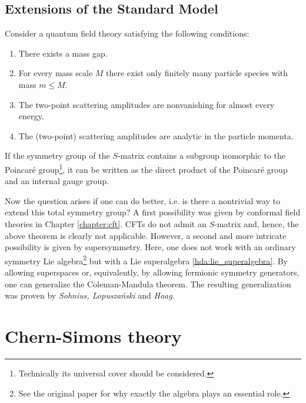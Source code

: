 \subsection{Extensions of the Standard Model}

    \begin{theorem}
        Consider a quantum field theory satisfying the following conditions:
        \begin{enumerate}
            \item There exists a mass gap.
            \item For every mass scale $M$ there exist only finitely many particle species with mass $m\leq M$.
            \item The two-point scattering amplitudes are nonvanishing for almost every energy.
            \item The (two-point) scattering amplitudes are analytic in the particle momenta.
        \end{enumerate}
        If the symmetry group of the $S$-matrix contains a subgroup isomorphic to the Poincar\'e group\footnote{Technically its universal cover should be considered.}, it can be written as the direct product of the Poincar\'e group and an internal gauge group.
    \end{theorem}

    Now the question arises if one can do better, i.e. is there a nontrivial way to extend this total symmetry group? A first possibility was given by conformal field theories in Chapter \ref{chapter:cft}. CFTs do not admit an $S$-matrix and, hence, the above theorem is clearly not applicable. However, a second and more intricate possibility is given by supersymmetry. Here, one does not work with an ordinary symmetry Lie algebra\footnote{See the original paper \cite{coleman_mandula} for why exactly the algebra plays an essential role.} but with a Lie superalgebra \ref{hda:lie_superalgebra}. By allowing superspaces or, equivalently, by allowing fermionic symmetry generators, one can generalize the Coleman-Mandula theorem. The resulting generalization was proven by \textit{Sohnius, Lopusza\'nski} and \textit{Haag}.

\section{Chern-Simons theory}

